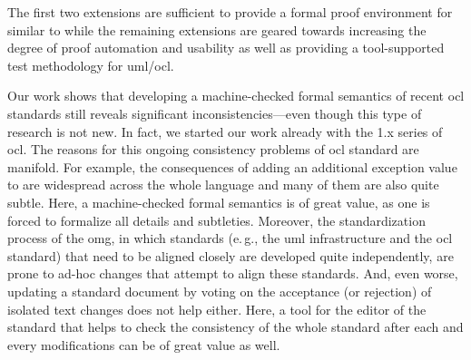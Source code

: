 \documentclass[11pt,a4paper,openright,twoside,abstracton]{scrreprt}
\newcommand{\eg}{e.\,g.\xspace}
\begin{document}
The first two extensions are sufficient to provide a formal proof
environment for  similar to \holocl while the remaining
extensions are geared towards increasing the degree of proof
automation and usability as well as providing a tool-supported test
methodology for \acs{uml}/\acs{ocl}.


Our work shows that developing a machine-checked formal semantics of
recent \acs{ocl} standards still reveals significant
inconsistencies---even though this type of research is not new. In
fact, we started our work already with the 1.x series of
\acs{ocl}. The reasons for this ongoing consistency problems of
\acs{ocl} standard are manifold. For example, the consequences of
adding an additional exception value to  are widespread across
the whole language and many of them are also quite subtle. Here, a
machine-checked formal semantics is of great value, as one is forced
to formalize all details and subtleties.  Moreover, the
standardization process of the \acs{omg}, in which standards (\eg, the
\acs{uml} infrastructure and the \acs{ocl} standard) that need to be
aligned closely are developed quite independently, are prone to ad-hoc
changes that attempt to align these standards. And, even worse,
updating a standard document by voting on the acceptance (or
rejection) of isolated text changes does not help either. Here, a tool
for the editor of the standard that helps to check the consistency of
the whole standard after each and every modifications can be of great
value as well.




\listofacronyms{}
\end{document}
